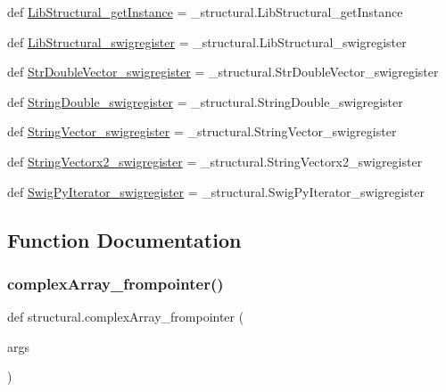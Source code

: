 \begin{DoxyCompactItemize}
\item 
def \hyperlink{namespacestructural_a5b9b7dd1dbc7ff83e06446aa96f3bf20}{Lib\+Structural\+\_\+get\+Instance} = \+\_\+structural.\+Lib\+Structural\+\_\+get\+Instance
\item 
def \hyperlink{namespacestructural_aeffaaca9a68746ce5bdc21077b257051}{Lib\+Structural\+\_\+swigregister} = \+\_\+structural.\+Lib\+Structural\+\_\+swigregister
\item 
def \hyperlink{namespacestructural_ae674a8976fcb37ff3852fb3118852fab}{Str\+Double\+Vector\+\_\+swigregister} = \+\_\+structural.\+Str\+Double\+Vector\+\_\+swigregister
\item 
def \hyperlink{namespacestructural_a98510f73f374b0fb66dd5880d30b8804}{String\+Double\+\_\+swigregister} = \+\_\+structural.\+String\+Double\+\_\+swigregister
\item 
def \hyperlink{namespacestructural_aa41fe076194cccc05745f86d0c5be1d7}{String\+Vector\+\_\+swigregister} = \+\_\+structural.\+String\+Vector\+\_\+swigregister
\item 
def \hyperlink{namespacestructural_a4fc09a5eb5b1f4f6d95ab3ad83e0e672}{String\+Vectorx2\+\_\+swigregister} = \+\_\+structural.\+String\+Vectorx2\+\_\+swigregister
\item 
def \hyperlink{namespacestructural_a2dba17e64dbc00de69659de559608be3}{Swig\+Py\+Iterator\+\_\+swigregister} = \+\_\+structural.\+Swig\+Py\+Iterator\+\_\+swigregister
\end{DoxyCompactItemize}


\subsection{Function Documentation}
\mbox{\label{namespacestructural_a82f8f336182548d199c1620ab06254ae}} 
\subsubsection{\texorpdfstring{complex\+Array\+\_\+frompointer()}{complexArray\_frompointer()}}
{\footnotesize\ttfamily def structural.\+complex\+Array\+\_\+frompointer (\begin{DoxyParamCaption}\item[{}]{args }\end{DoxyParamCaption})}

